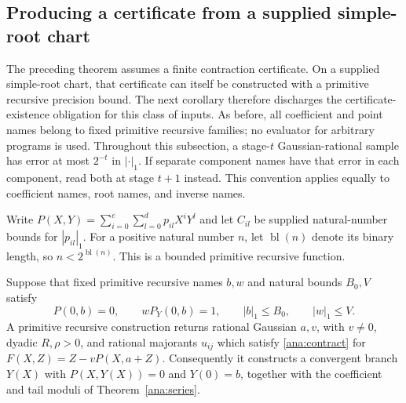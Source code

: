 \subsection{Producing a certificate from a supplied simple-root chart}
\label{ana:producersection}

The preceding theorem assumes a finite contraction certificate.  On a
supplied simple-root chart, that certificate can itself be constructed
with a primitive recursive precision bound.  The next corollary therefore
discharges the certificate-existence obligation for this class of inputs.
As before, all coefficient and point names belong to fixed primitive
recursive families; no evaluator for arbitrary programs is used.
Throughout this subsection, a stage-$t$ Gaussian-rational sample has
error at most $2^{-t}$ in $|\cdot|_1$.  If separate component names
have that error in each component, read both at stage $t+1$ instead.
This convention applies equally to coefficient names, root names,
and inverse names.

Write $P(X,Y)=\sum_{i=0}^e\sum_{l=0}^d p_{il}X^iY^l$ and let
$C_{il}$ be supplied natural-number bounds for $|p_{il}|_1$.
For a positive natural number $n$, let $\operatorname{bl}(n)$ denote
its binary length, so $n<2^{\operatorname{bl}(n)}$.
This is a bounded primitive recursive function.

\begin{corollary}
\label{ana:producer}
Suppose that fixed primitive recursive names $b,w$ and natural bounds
$B_0,V$ satisfy
\[
 P(0,b)=0,\qquad wP_Y(0,b)=1,\qquad |b|_1\le B_0,
 \qquad |w|_1\le V.
\]
A primitive recursive construction returns rational Gaussian $a,v$,
with $v\ne0$, dyadic $R,\rho>0$, and rational majorants $u_{ij}$
which satisfy \eqref{ana:contract} for
$F(X,Z)=Z-vP(X,a+Z)$.
Consequently it constructs a convergent branch $Y(X)$ with
$P(X,Y(X))=0$ and $Y(0)=b$, together with the coefficient and tail
moduli of Theorem~\ref{ana:series}.
\end{corollary}

